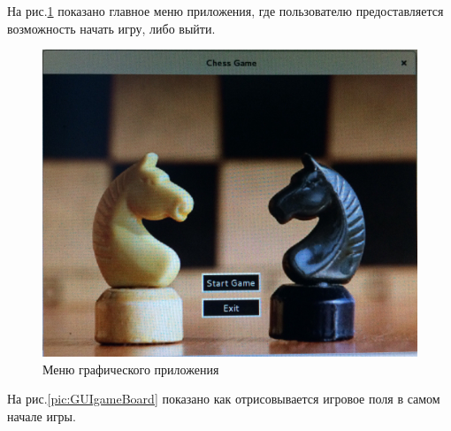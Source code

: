 На рис.\ref{pic:GUImenu} показано главное меню приложения, где пользователю предоставляется возможность начать игру, либо выйти.\\
\begin{figure}[H]
	\begin{center}
		\includegraphics[scale=0.1]{pics/menuGui.jpg}
		\caption{Меню графического приложения} 
		\label{pic:GUImenu} %
	\end{center}
\end{figure}

На рис.\ref{pic:GUIgameBoard} показано как отрисовывается игровое поля в самом начале игры.\\

